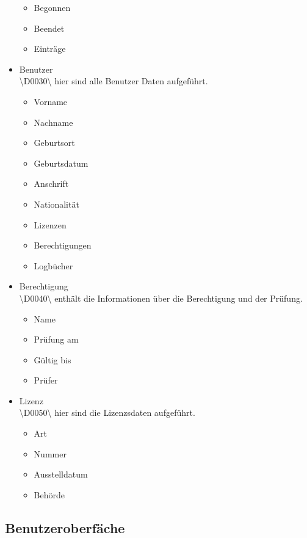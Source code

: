 \documentclass[a4paper]{article} %
\begin{document}
\begin{itemize}
\begin{itemize}
            \item Begonnen
            \item Beendet
            \item Einträge
        \end{itemize}
        \pagebreak
        \item Benutzer\\
        \textbackslash D0030\textbackslash{} hier sind alle Benutzer Daten aufgeführt.
        \begin{itemize}
            \item Vorname
            \item Nachname
            \item Geburtsort
            \item Geburtsdatum
            \item Anschrift
            \item Nationalität
            \item Lizenzen
            \item Berechtigungen
            \item Logbücher
        \end{itemize}
        \item Berechtigung\\
        \textbackslash D0040\textbackslash{} enthält die Informationen über die Berechtigung und der Prüfung.
        \begin{itemize}
            \item Name
            \item Prüfung am
            \item Gültig bis
            \item Prüfer
        \end{itemize}
        \item Lizenz\\
        \textbackslash D0050\textbackslash{} hier sind die Lizenzsdaten aufgeführt.
        \begin{itemize}
            \item Art
            \item Nummer
            \item Ausstelldatum
            \item Behörde
        \end{itemize}
    \end{itemize}
    
    \pagebreak
    \subsection{Benutzeroberfäche}
    \vspace{1cm}
\end{document}
